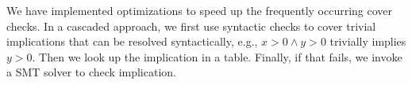 \documentclass[conference]{IEEEtran}
\begin{document}





We have implemented optimizations to speed up the frequently occurring cover
checks.  In a cascaded approach, we first use syntactic checks to cover
trivial implications that can be resolved syntactically, e.g., $x>0 \wedge
y>0$ trivially implies $y>0$.  Then we look up the implication in a table. 
Finally, if that fails, we invoke a SMT solver to check implication.


\begin{table*}
\centering


\end{table*}
\end{document}
